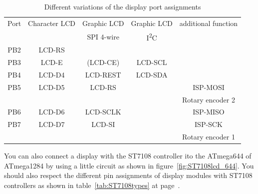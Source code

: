 \begin{table}[H]
  \begin{center}
    \begin{tabular}{| c || c | c | c | c |}
    \hline
      Port & Character LCD &  Graphic LCD  & Graphic LCD  & additional function\\
           &               &  SPI 4-wire   &   I\textsuperscript{2}C        &            \\
    \hline
    \hline
    PB2    &  LCD-RS         &            &             &       \\
    \hline
    PB3    &  LCD-E          &  (LCD-CE)  &  LCD-SCL    &       \\
    \hline
    PB4    &  LCD-D4         &  LCD-REST  &  LCD-SDA    &       \\
    \hline
    PB5    &  LCD-D5         &  LCD-RS    &             & ISP-MOSI \\
           &                 &            &             & Rotary encoder 2 \\
    \hline
    PB6    &  LCD-D6         &  LCD-SCLK  &             & ISP-MISO \\
    \hline
    PB7    &  LCD-D7         &  LCD-SI    &             & ISP-SCK  \\
           &                 &            &             & Rotary encoder 1 \\
    \hline
    \end{tabular}
  \end{center}
  \caption{Different variations of the display port assignments}
  \label{tab:mega644-display}
\end{table}

You can also connect a display with the ST7108 controller ito the ATmega644 of ATmega1284 by using
a little circuit as shown in figure~\ref{fig:ST7108lcd_644}.
You should also respect the different pin assignments of display modules with ST7108 controllers as 
shown in table~\ref{tab:ST7108types} at page~\pageref{tab:ST7108types}.

